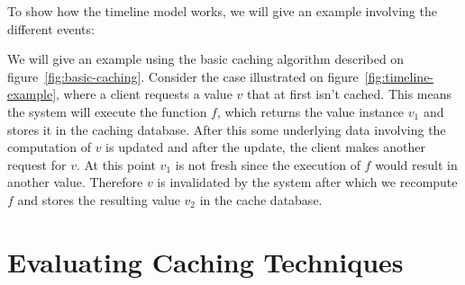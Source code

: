 To show how the timeline model works, we will give an example involving the different events:

\begin{example}
\label{example:timeline-model}
We will give an example using the basic caching algorithm described on figure~\ref{fig:basic-caching}. Consider the case illustrated on figure~\ref{fig:timeline-example}, where a client requests a value $v$ that at first isn't cached. This means the system will execute the function $f$, which returns the value instance $v_1$ and stores it in the caching database. After this some underlying data involving the computation of $v$ is updated and after the update, the client makes another request for $v$. At this point $v_1$ is not fresh since the execution of $f$ would result in another value. Therefore $v$ is invalidated by the system after which we recompute $f$ and stores the resulting value $v_2$ in the cache database.

\begin{figure*}[ht!]
  \centering
  \caption{Example of the timeline model}
  \label{fig:timeline-example}
\end{figure*}

\end{example}






\section{Evaluating Caching Techniques}
\label{sec:evaluating_caching_techniques}

